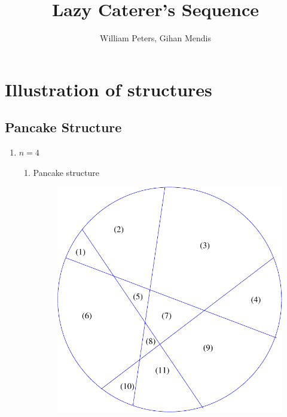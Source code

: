 \documentclass[a4paper,10pt]{article}
\title{Lazy Caterer's Sequence}
\author{William Peters, Gihan Mendis}
\begin{document}
\maketitle

\section{Illustration of structures}

\subsection{Pancake Structure}
\begin{enumerate}
  \item $n = 4$\\
  	\begin{enumerate}
    	\item Pancake structure\\
    	\begin{figure}[h!]
			\includegraphics[scale=0.3]{graphics/pancakecut11}
			\captionsetup{labelformat=empty}
			\caption{}
			\label{fig:pancakecut11}
		\end{figure}
  \end{enumerate}
  

\end{enumerate}
\end{document}
